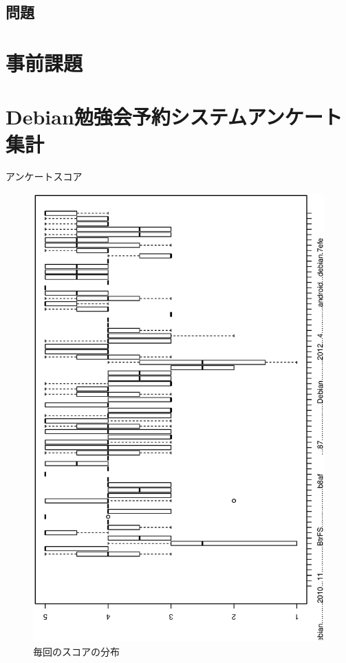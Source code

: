 \subsection{問題}


\section{事前課題}
{\footnotesize
 
}

\section{Debian勉強会予約システムアンケート集計}

\begin{frame}{アンケートスコア}

\begin{figure}[h]
\begin{center}
  \includegraphics[angle=270,width=0.8\hsize]{image201301/enquete_boxplot.eps}

\end{center}
 \caption{毎回のスコアの分布}\label{fig:enquete-score-distribution}
\end{figure}
 
\end{frame}



